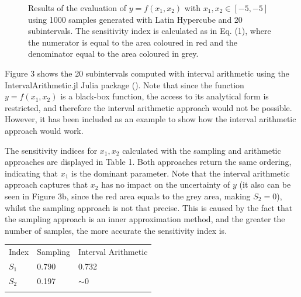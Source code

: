 \documentclass[twocolumn]{rps-esrel2022}
\begin{document}
\begin{figure}[!b]
	\caption{Results of the evaluation of $y=f(x_1,x_2)$ with $x_1,x_2 \in [-5,-5]$ using 1000 samples generated with Latin Hypercube and 20 subintervals.
	The sensitivity index is calculated as in Eq. (1), where the numerator is equal to the area coloured in red and the denominator
	equal to the area coloured in grey.}
	\label{fig:myfig}
\end{figure}

Figure 3 shows the 20 subintervals computed with interval arithmetic using the IntervalArithmetic.jl Julia package (\cite{benet2020juliaintervals}).
Note that since the function $y = f(x_1,x_2)$ is a black-box function, the access to its analytical form is restricted, and therefore the
interval arithmetic approach would not be possible.
However, it has been included as an example to show how the interval arithmetic approach would work.

The sensitivity indices for $x_1,x_2$ calculated with the sampling and arithmetic approaches are displayed in Table 1.
Both approaches return the same ordering, indicating that $x_1$ is the dominant parameter.
Note that the interval arithmetic approach captures that $x_2$ has no impact on the uncertainty of $y$ (it also can be seen in Figure 3b, since the
red area equals to the grey area, making $S_2 = 0$), whilst the sampling approach is not that precise.
This is caused by the fact that the sampling approach is an inner approximation method, and the greater the number of samples,
the more accurate the sensitivity index is.

\begin{table}[!h]
	{
	\begin{tabular}{@{}lll@{}}\toprule 
	Index & Sampling & Interval Arithmetic\\
\colrule

	$S_1$ & 0.790 & 0.732\\
	$S_2$ & 0.197 & $\sim0$\\
\botrule
	\end{tabular}}

\end{table}
\end{document}
